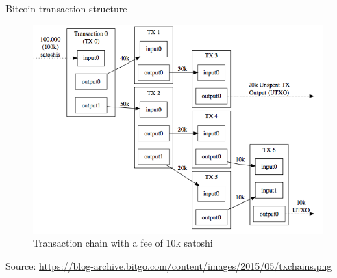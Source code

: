 \documentclass[11pt]{beamer}
\begin{document}
\begin{frame}{Bitcoin transaction structure}
	\begin{figure}[]
		\centering
		\includegraphics  [scale=0.4]{Images/tx-chain}
		\caption{Transaction chain with a fee of 10k satoshi}
	\end{figure}
	\begin{tiny}
		Source: \href{https://blog-archive.bitgo.com/the-challenges-of-block-chain-indexing/}{https://blog-archive.bitgo.com/content/images/2015/05/txchains.png}
	\end{tiny}
\end{frame}



\end{document}
